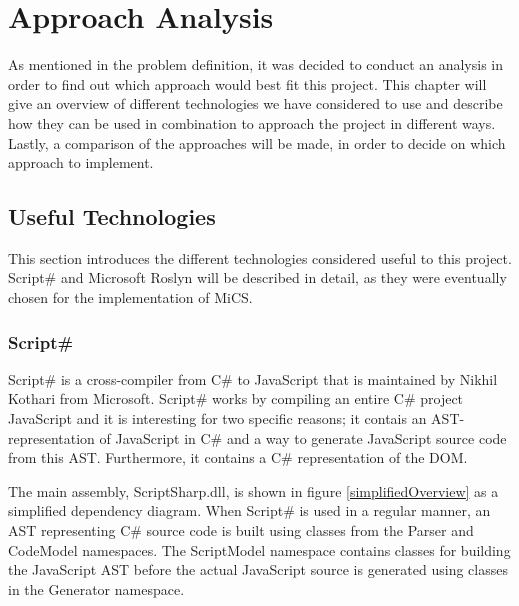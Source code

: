 \chapter{Approach Analysis}
	As mentioned in the problem definition, it was decided to conduct an analysis in order to find out which approach would best fit this project. This chapter will give an overview of different technologies we have considered to use and describe how they can be used in combination to approach the project in different ways. Lastly, a comparison of the approaches will be made, in order to decide on which approach to implement.

\section{Useful Technologies}
	This section introduces the different technologies considered useful to this project. Script\# and Microsoft Roslyn will be described in detail, as they were eventually chosen for the implementation of MiCS.

	

	\subsection{Script\#} %
	\label{sub:subsection_name}
		Script\# \cite{scriptsharp} is a cross-compiler from C\# to JavaScript that is maintained by Nikhil Kothari \cite{nikhilk} from Microsoft. Script\# works by compiling an entire C\# project JavaScript and it is interesting for two specific reasons; it contais an AST-representation of JavaScript in C\# and a way to generate JavaScript source code from this AST. Furthermore, it contains a C\# representation of the DOM.

		The main assembly, ScriptSharp.dll, is shown in figure \ref{simplifiedOverview} as a simplified dependency diagram. When Script\# is used in a regular manner, an AST representing C\# source code is built using classes from the Parser and CodeModel namespaces. The ScriptModel namespace contains classes for building the JavaScript AST before the actual JavaScript source is generated using classes in the Generator namespace.


